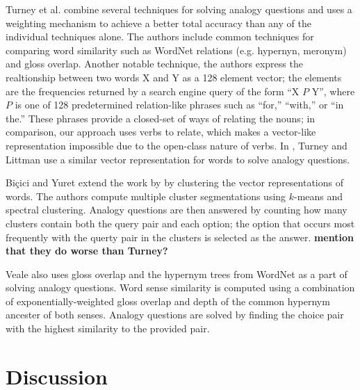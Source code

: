 \documentclass[11pt]{article}
\begin{document}
Turney et al. combine several techniques for solving analogy questions and uses a
weighting mechanism to achieve a better total accuracy than any of the
individual techniques alone\cite{turney03combining}.  The authors include common
techniques for comparing word similarity such as WordNet relations (e.g. hypernyn,
meronym) and gloss overlap.  Another notable technique, the authors express the
realtionship between two words X and Y as a 128 element vector; the elements are
the frequencies returned by a search engine query of the form ``X $P$ Y'', where
$P$ is one of 128 predetermined relation-like phrases such as ``for,'' ``with,''
or ``in the.''  These phrases provide a closed-set of ways of relating the
nouns; in comparison, our approach uses verbs to relate, which makes a
vector-like representation impossible due to the open-class nature of verbs.  In
\cite{turney05corpus}, Turney and Littman use a similar vector representation
for words to solve analogy questions.

Bi\c{c}ici and Yuret extend the work by \cite{turney05corpus} by clustering the
vector representations of words\cite{bicici06clustering}.  The authors compute
multiple cluster segmentations using $k$-means and spectral clustering.  Analogy
questions are then answered by counting how many clusters contain both the query
pair and each option; the option that occurs most frequently with the querty
pair in the clusters is selected as the answer.  {\bf mention that they do worse
  than Turney?}

Veale also uses gloss overlap and the hypernym trees from WordNet as a part of
solving analogy questions\cite{veale04wordnet}.  Word sense similarity is
computed using a combination of exponentially-weighted gloss overlap and depth
of the common hypernym ancester of both senses.  Analogy questions are solved by
finding the choice pair with the highest similarity to the provided pair.

\section{Discussion}
\label{sec:discussion}
\end{document}
